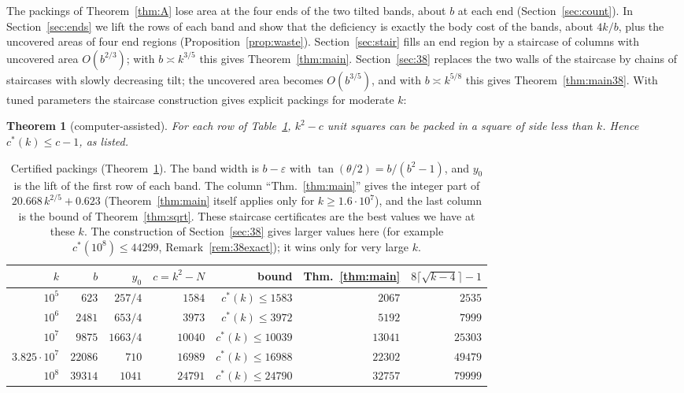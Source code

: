 \documentclass[11pt]{amsart}
\newcommand{\cs}{c^{*}}
\newtheorem{theorem}{Theorem}[section]
\theoremstyle{definition}
\theoremstyle{remark}
\numberwithin{equation}{section}
\begin{document}
The packings of Theorem~\ref{thm:A} lose area at the four ends of the two tilted bands, about $b$ at each end
(Section~\ref{sec:count}). In Section~\ref{sec:ends} we lift the rows of each band and show that the deficiency is
exactly the body cost of the bands, about $4k/b$, plus the uncovered areas of four end regions
(Proposition~\ref{prop:waste}). Section~\ref{sec:stair} fills an end region by a staircase of columns with uncovered
area $O(b^{2/3})$; with $b\asymp k^{3/5}$ this gives Theorem~\ref{thm:main}. Section~\ref{sec:38} replaces the two
walls of the staircase by chains of staircases with slowly decreasing tilt; the uncovered area becomes $O(b^{3/5})$,
and with $b\asymp k^{5/8}$ this gives Theorem~\ref{thm:main38}. With tuned parameters the staircase construction gives
explicit packings for moderate $k$:

\begin{theorem}[computer-assisted]\label{thm:cert}
For each row of Table~\ref{tab:cert}, $k^2-c$ unit squares can be packed in a square of side less than $k$. Hence
$\cs(k)\le c-1$, as listed.
\end{theorem}

\begin{table}[ht]
\centering
\begin{tabular}{rrrrrrr}
\toprule
$k$ & $b$ & $y_0$ & $c=k^2-N$ & bound & Thm.~\ref{thm:main} & $8\lceil\sqrt{k-4}\rceil-1$\\
\midrule
$10^5$ & $623$ & $257/4$ & $1584$ & $\cs(k)\le1583$ & $2067$ & $2535$\\
$10^6$ & $2481$ & $653/4$ & $3973$ & $\cs(k)\le3972$ & $5192$ & $7999$\\
$10^7$ & $9875$ & $1663/4$ & $10040$ & $\cs(k)\le10039$ & $13041$ & $25303$\\
$3.825\cdot10^7$ & $22086$ & $710$ & $16989$ & $\cs(k)\le16988$ & $22302$ & $49479$\\
$10^8$ & $39314$ & $1041$ & $24791$ & $\cs(k)\le24790$ & $32757$ & $79999$\\
\bottomrule
\end{tabular}
\medskip
\caption{Certified packings (Theorem~\ref{thm:cert}). The band width is $b-\varepsilon$ with
$\tan(\theta/2)=b/(b^2-1)$, and $y_0$ is the lift of the first row of each band. The column ``Thm.~\ref{thm:main}''
gives the integer part of $20.668\,k^{2/5}+0.623$ (Theorem~\ref{thm:main} itself applies only for $k\ge1.6\cdot10^7$),
and the last column is the bound of Theorem~\ref{thm:sqrt}. These staircase certificates are the best values we have
at these $k$. The construction of Section~\ref{sec:38} gives larger values here (for example $\cs(10^8)\le44299$,
Remark~\ref{rem:38exact}); it wins only for very large $k$.}\label{tab:cert}
\end{table}
\end{document}
